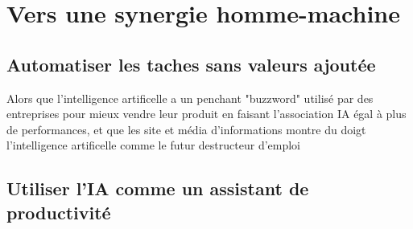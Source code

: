 \part{Vers une synergie homme-machine}

\chapter{Automatiser les taches sans valeurs ajoutée}
Alors que l'intelligence artificelle a un penchant "buzzword" utilisé par des entreprises pour 
mieux vendre leur produit en faisant l'association IA égal à plus de performances, et que les 
site et média d'informations montre du doigt l'intelligence artificelle comme le futur destructeur 
d'emploi  
\chapter{Utiliser l'IA comme un assistant de productivité}
